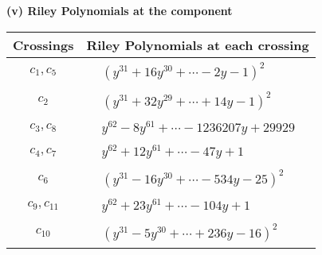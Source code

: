 \documentclass[1p]{elsarticle_modified}
\theoremstyle{definition}
\begin{document}
\flushleft \textbf{(v) Riley Polynomials at the component}\newline \\
\begin{tabular}{m{50pt}|m{274pt}}
Crossings & \hspace{64pt}Riley Polynomials at each crossing \\
\hline $$\begin{aligned}c_{1},c_{5}\end{aligned}$$&$\begin{aligned}
&(y^{31}+16 y^{30}+\cdots-2 y-1)^{2}
\end{aligned}$\\
\hline $$\begin{aligned}c_{2}\end{aligned}$$&$\begin{aligned}
&(y^{31}+32 y^{29}+\cdots+14 y-1)^{2}
\end{aligned}$\\
\hline $$\begin{aligned}c_{3},c_{8}\end{aligned}$$&$\begin{aligned}
&y^{62}-8 y^{61}+\cdots-1236207 y+29929
\end{aligned}$\\
\hline $$\begin{aligned}c_{4},c_{7}\end{aligned}$$&$\begin{aligned}
&y^{62}+12 y^{61}+\cdots-47 y+1
\end{aligned}$\\
\hline $$\begin{aligned}c_{6}\end{aligned}$$&$\begin{aligned}
&(y^{31}-16 y^{30}+\cdots-534 y-25)^{2}
\end{aligned}$\\
\hline $$\begin{aligned}c_{9},c_{11}\end{aligned}$$&$\begin{aligned}
&y^{62}+23 y^{61}+\cdots-104 y+1
\end{aligned}$\\
\hline $$\begin{aligned}c_{10}\end{aligned}$$&$\begin{aligned}
&(y^{31}-5 y^{30}+\cdots+236 y-16)^{2}
\end{aligned}$\\
\hline
\end{tabular}\\~\\
\end{document}
